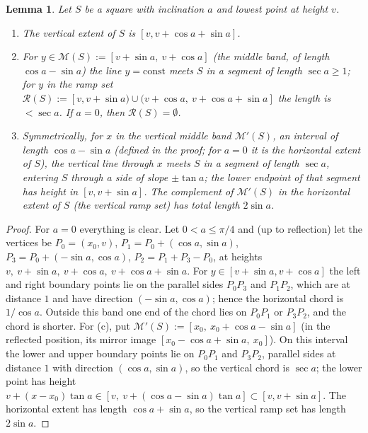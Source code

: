 \documentclass[11pt]{amsart}
\newtheorem{lemma}[theorem]{Lemma}
\theoremstyle{definition}
\theoremstyle{remark}
\begin{document}
\begin{lemma}\label{lem:geom}
Let $S$ be a square with inclination $a$ and lowest point at height $v$.
\begin{enumerate}[label=(\alph*)]
\item The vertical extent of $S$ is $[v,v+\cos a+\sin a]$.
\item For $y\in\mathcal M(S):=[v+\sin a,\ v+\cos a]$ (the \emph{middle band}, of length $\cos a-\sin a$) the line
$y=\mathrm{const}$ meets $S$ in a segment of length $\sec a\ge 1$; for $y$ in the \emph{ramp set}
$\mathcal R(S):=[v,v+\sin a)\cup(v+\cos a,\ v+\cos a+\sin a]$ the length is $<\sec a$. If $a=0$, then $\mathcal R(S)=\emptyset$.
\item Symmetrically, for $x$ in the \emph{vertical middle band} $\mathcal M'(S)$, an interval of length
$\cos a-\sin a$ \textup{(}defined in the proof; for $a=0$ it is the horizontal extent of $S$\textup{)}, the vertical line through $x$ meets $S$ in a segment of length $\sec a$, entering $S$ through a
side of slope $\pm\tan a$; the lower endpoint of that segment has height in $[v,v+\sin a]$. The complement of
$\mathcal M'(S)$ in the horizontal extent of $S$ (the \emph{vertical ramp set}) has total length $2\sin a$.
\end{enumerate}
\end{lemma}

\begin{proof}
For $a=0$ everything is clear. Let $0<a\le\pi/4$ and (up to reflection) let the vertices be
$P_0=(x_0,v)$, $P_1=P_0+(\cos a,\sin a)$, $P_3=P_0+(-\sin a,\cos a)$, $P_2=P_1+P_3-P_0$, at heights
$v,\ v+\sin a,\ v+\cos a,\ v+\cos a+\sin a$. For $y\in[v+\sin a,v+\cos a]$ the left and right boundary points lie on
the parallel sides $P_0P_3$ and $P_1P_2$, which are at distance $1$ and have direction $(-\sin a,\cos a)$; hence the
horizontal chord is $1/\cos a$. Outside this band one end of the chord lies on $P_0P_1$ or $P_3P_2$, and the chord is
shorter. For (c), put $\mathcal M'(S):=[x_0,\ x_0+\cos a-\sin a]$ (in the reflected position, its mirror image
$[x_0-\cos a+\sin a,\ x_0]$). On this interval the lower and upper boundary points lie on $P_0P_1$ and $P_3P_2$,
parallel sides at distance $1$ with direction $(\cos a,\sin a)$, so the vertical chord is $\sec a$; the lower point
has height $v+(x-x_0)\tan a\in[v,\ v+(\cos a-\sin a)\tan a]\subset[v,v+\sin a]$. The horizontal extent has length
$\cos a+\sin a$, so the vertical ramp set has length $2\sin a$.
\end{proof}
\end{document}
